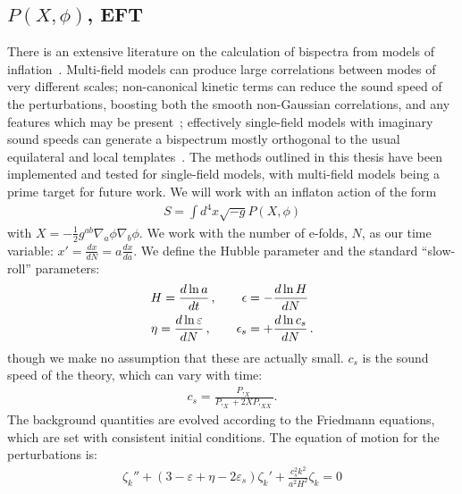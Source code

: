     \subsection{$P(X, \phi)$, EFT}
    There is an extensive literature on the calculation
of bispectra from models of inflation~\cite{chen_easther_lim_1,chen_easther_lim_2,chen_ng_0605,seery_ng_0503,px_burrage,adshead,flauger_pajer_resonant,features_bartolo,bdy_passaglia}.
Multi-field models can produce large
correlations between modes of very different scales;
non-canonical kinetic terms can reduce the sound speed of the perturbations,
boosting both the smooth non-Gaussian correlations, and any
features which may be present~\cite{dbi_adshead,dbi_in_the_sky,dbi_miranda,dbi_silverstein,dbi_step_miranda,chen_folded_resonant,osc_avila};
effectively single-field models with imaginary sound speeds can generate a bispectrum
mostly orthogonal to the usual equilateral and local templates~\cite{RP_1}.
The methods outlined in this thesis have been implemented
and tested for single-field models,
with multi-field models being a prime target for future work.
We will work with an inflaton action of the form
\begin{align}
S = \int d^4x \sqrt{-g}P(X,\phi)
\end{align}
with $X=-\frac{1}{2}g^{ab}\nabla_a \phi\nabla_b \phi$.
We work with the number of e-folds, $N$, as our time variable:
$x'=\frac{dx}{dN}=a\frac{dx}{da}$.
We define the Hubble parameter and the standard ``slow-roll'' parameters:
\begin{equation}
\label{slowrollparams}
\begin{split}
    H = \frac{d\ln a}{dt}	\,,
    \qquad
    \epsilon &= -\frac{d\ln H}{dN}	\\
    \eta = \frac{d\ln \varepsilon}{dN}	\,,
    \qquad
    \epsilon_s &= +\frac{d\ln c_s}{dN}	\,.
\end{split}
\end{equation}
though we make no assumption that these are actually small.
$c_s$ is the sound speed of the theory, which can vary with time:
\begin{align}
c_s=\frac{P,_X}{P,_X+2XP,_{XX}}.
\end{align}
The background quantities are evolved according to the Friedmann equations,
which are set with consistent initial conditions.
The equation of motion for the perturbations is:
\begin{align}\label{modefneqn}
\zeta_k''+(3-\varepsilon+\eta-2\varepsilon_s)\zeta_k'+\frac{c_s^2k^2}{a^2H^2}\zeta_k=0
\end{align}
